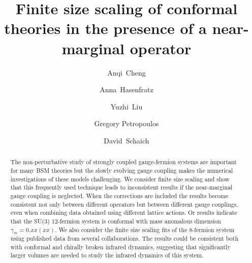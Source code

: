 \documentclass[aps,prl,twocolumn,]{revtex4}  %
\begin{document}
\title{Finite size scaling of conformal theories in the presence of a near-marginal operator}


\author{Anqi~Cheng}
\author{Anna~Hasenfratz}
\author{Yuzhi~Liu}
\author{Gregory Petropoulos}
\author{David~Schaich}

\begin{abstract}
The non-perturbative study of strongly coupled gauge-fermion systems  are important for many BSM theories  but the  slowly evolving gauge coupling  makes the numerical investigations of these models challenging. We consider finite size scaling and show that this  frequently used technique leads to inconsistent results if the near-marginal gauge coupling is neglected. When the corrections are included the results become consistent not only between different operators but between different gauge couplings, even when combining data obtained using different lattice actions. Or results indicate that the SU(3) 12-fermion system is conformal with mass anomalous dimension $\gamma_m=0.xx(xx)$. We also consider the finite size scaling fits of the 8-fermion system using published data from several collaborations. The results could be consistent both with conformal and chirally broken infrared dynamics, suggesting  that significantly larger volumes are needed to study the infrared dynamics of this system. 
\end{abstract}

\maketitle






\end{document}
